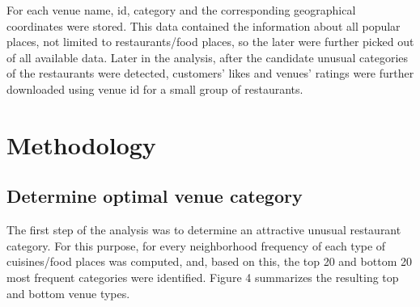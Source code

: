 \documentclass[11pt]{article}
\numberwithin{equation}{section}
\begin{document}
For each venue name, id, category and the corresponding geographical coordinates were stored. This data contained the information about all popular places, not limited to restaurants/food places, so the later were further picked out of all available data. Later in the analysis, after the candidate unusual categories of the restaurants were detected, customers' likes and venues' ratings were further downloaded using venue id for a small group of restaurants.

\section{Methodology}
\subsection{Determine optimal venue category}
The first step of the analysis was to determine an attractive unusual restaurant category. For this purpose, for every neighborhood frequency of each type of cuisines/food places was computed, and, based on this, the top 20 and bottom 20 most frequent categories were identified. Figure 4 summarizes the resulting top and bottom venue types. 
\end{document}
